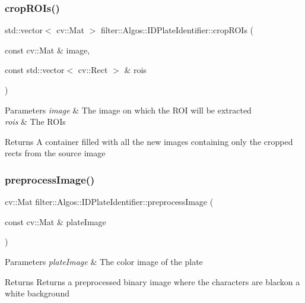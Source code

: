 \subsubsection{\texorpdfstring{crop\+R\+O\+Is()}{cropROIs()}}
{\footnotesize\ttfamily std\+::vector$<$ cv\+::\+Mat $>$ filter\+::\+Algos\+::\+I\+D\+Plate\+Identifier\+::crop\+R\+O\+Is (\begin{DoxyParamCaption}\item[{const cv\+::\+Mat \&}]{image,  }\item[{const std\+::vector$<$ cv\+::\+Rect $>$ \&}]{rois }\end{DoxyParamCaption})\hspace{0.3cm}{\ttfamily [private]}}


\begin{DoxyParams}{Parameters}
{\em image} & The image on which the R\+OI will be extracted \\
\hline
{\em rois} & The R\+O\+Is \\
\hline
\end{DoxyParams}
\begin{DoxyReturn}{Returns}
A container filled with all the new images containing only the cropped rects from the source image 
\end{DoxyReturn}
\mbox{\label{classfilter_1_1_algos_1_1_i_d_plate_identifier_a4ce2afa02689d7047310c64907cc40a4}} 
\subsubsection{\texorpdfstring{preprocess\+Image()}{preprocessImage()}}
{\footnotesize\ttfamily cv\+::\+Mat filter\+::\+Algos\+::\+I\+D\+Plate\+Identifier\+::preprocess\+Image (\begin{DoxyParamCaption}\item[{const cv\+::\+Mat \&}]{plate\+Image }\end{DoxyParamCaption})\hspace{0.3cm}{\ttfamily [private]}}


\begin{DoxyParams}{Parameters}
{\em plate\+Image} & The color image of the plate \\
\hline
\end{DoxyParams}
\begin{DoxyReturn}{Returns}
Returns a preprocessed binary image where the characters are blackon a white background 
\end{DoxyReturn}


